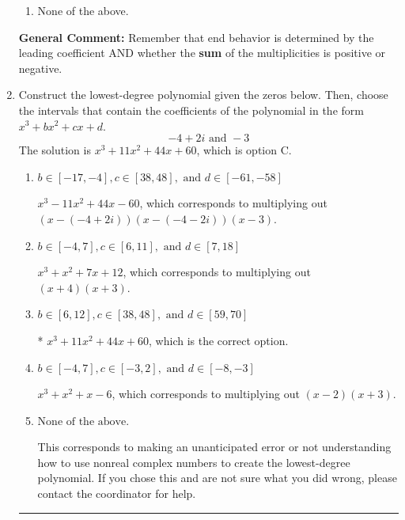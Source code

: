 \documentclass{extbook}[14pt]
\newcommand{\litem}[1]{\item #1

\rule{\textwidth}{0.4pt}}
\begin{document}
\begin{enumerate}
{\begin{enumerate}[label=\Alph*.]
\begin{multicols}{2}
\end{multicols}\item None of the above.\end{enumerate}
\textbf{General Comment:} Remember that end behavior is determined by the leading coefficient AND whether the \textbf{sum} of the multiplicities is positive or negative.
}
\litem{
Construct the lowest-degree polynomial given the zeros below. Then, choose the intervals that contain the coefficients of the polynomial in the form $x^3+bx^2+cx+d$.
\[ -4 + 2 i \text{ and } -3 \]The solution is \( x^{3} +11 x^{2} +44 x + 60 \), which is option C.\begin{enumerate}[label=\Alph*.]
\item \( b \in [-17, -4], c \in [38, 48], \text{ and } d \in [-61, -58] \)

$x^{3} -11 x^{2} +44 x -60$, which corresponds to multiplying out $(x-(-4 + 2 i))(x-(-4 - 2 i))(x -3)$.
\item \( b \in [-4, 7], c \in [6, 11], \text{ and } d \in [7, 18] \)

$x^{3} + x^{2} +7 x + 12$, which corresponds to multiplying out $(x + 4)(x + 3)$.
\item \( b \in [6, 12], c \in [38, 48], \text{ and } d \in [59, 70] \)

* $x^{3} +11 x^{2} +44 x + 60$, which is the correct option.
\item \( b \in [-4, 7], c \in [-3, 2], \text{ and } d \in [-8, -3] \)

$x^{3} + x^{2} +x -6$, which corresponds to multiplying out $(x -2)(x + 3)$.
\item \( \text{None of the above.} \)

This corresponds to making an unanticipated error or not understanding how to use nonreal complex numbers to create the lowest-degree polynomial. If you chose this and are not sure what you did wrong, please contact the coordinator for help.
\end{enumerate}

}
\end{enumerate}
\end{document}
